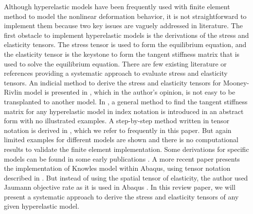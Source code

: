 Although hyperelastic models have been frequently used with finite element method to model the nonlinear deformation behavior, it is not straightforward to implement them because two key issues are vaguely addressed in literature. The first obstacle to implement hyperelastic models is the derivations of the stress and elasticity tensors. The stress tensor is used to form the equilibrium equation, and the elasticity tensor is the keystone to form the tangent stiffness matrix that is used to solve the equilibrium equation. There are few existing literature or references providing a systematic approach to evaluate stress and elasticity tensors. An indicial method to derive the stress and elasticity tensors for Mooney-Rivlin model is presented in \cite{Bower}, which in the author's opinion, is not easy to be transplanted to another model. In \cite{Belytschko}, a general method to find the tangent stiffness matrix for any hyperelastic model in index notation is introduced in an abstract form with no illustrated examples. A step-by-step method written in tensor notation is derived in \cite{Holzapfel}, which we refer to frequently in this paper. But again limited examples for different models are shown and there is no computational results to validate the finite element implementation. Some derivations for specific models can be found in some early publications \cite{Weiss, Nicholson}. A more recent paper \cite{Suchocki} presents the implementation of Knowles model within Abaqus, using tensor notation described in \cite{Holzapfel}. But instead of using the spatial tensor of elasticity, the author used Jaumann objective rate as it is used in Abaqus \cite{Abaqus}. In this review paper, we will present a systematic approach to derive the stress and elasticity tensors of any given hyperelastic model.


